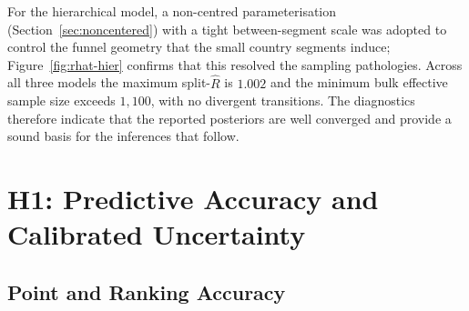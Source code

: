 

For the hierarchical model, a non-centred parameterisation (Section~\ref{sec:noncentered}) with a tight between-segment scale was adopted to control the funnel geometry that the small country segments induce; Figure~\ref{fig:rhat-hier} confirms that this resolved the sampling pathologies. Across all three models the maximum split-$\widehat{R}$ is $1.002$ and the minimum bulk effective sample size exceeds $1{,}100$, with no divergent transitions. The diagnostics therefore indicate that the reported posteriors are well converged and provide a sound basis for the inferences that follow.


\section{H1: Predictive Accuracy and Calibrated Uncertainty}
\label{sec:results-h1}

\subsection{Point and Ranking Accuracy}
\label{sec:results-accuracy}


